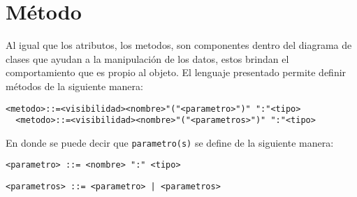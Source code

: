 \section{Método}
\label{sec:comentario}
Al igual que los atributos, los metodos, son componentes dentro del diagrama de
clases que ayudan a la manipulación de los datos, estos brindan el
comportamiento que es propio al objeto. El lenguaje presentado permite definir
métodos de la siguiente manera:

\begin{lstlisting}[basicstyle=\footnotesize\ttfamily]
  <metodo>::=<visibilidad><nombre>"("<parametro>")" ":"<tipo>
  <metodo>::=<visibilidad><nombre>"("<parametros>")" ":"<tipo>
\end{lstlisting}

En donde se puede decir que \texttt{parametro(s)} se define de la siguiente
manera:

\begin{lstlisting}[basicstyle=\footnotesize\ttfamily]
  <parametro> ::= <nombre> ":" <tipo>
\end{lstlisting}

\begin{lstlisting}[basicstyle=\footnotesize\ttfamily]
  <parametros> ::= <parametro> | <parametros>
\end{lstlisting}

